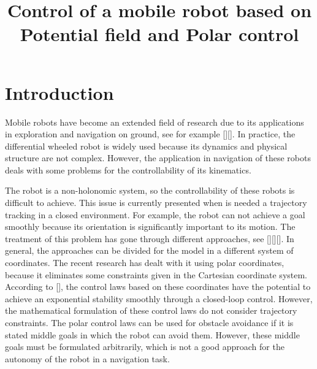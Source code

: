 \documentclass[conference]{IEEEtran}
\begin{document}
\title{Control of a mobile robot based on Potential field and Polar control}
\author{
}
\maketitle
\begin{abstract}

\end{abstract}
\IEEEpeerreviewmaketitle

\section{Introduction}

Mobile robots have become an extended field of research due to its applications in exploration and navigation on ground, see for example [][]. In practice, the differential wheeled robot is widely used because its dynamics and physical structure are not complex. However, the application in navigation of these robots deals with some problems for the controllability of its kinematics.

The robot is a non-holonomic system, so the controllability of these robots is difficult to achieve. This issue is currently presented when is needed a trajectory tracking in a closed environment. For example, the robot can not achieve a goal smoothly because its orientation is significantly important to its motion. The treatment of this problem has gone through different approaches, see [][][]. In general, the approaches can be divided for the model in a different system of coordinates. The recent research has dealt with it using polar coordinates, because it eliminates some constraints given in the Cartesian coordinate system. According to [], the control laws based on these coordinates have the potential to achieve an exponential stability smoothly through a closed-loop control. However, the mathematical formulation of these control laws do not consider trajectory constraints. The polar control laws can be used for obstacle avoidance if it is stated middle goals in which the robot can avoid them. However, these middle goals must be formulated arbitrarily, which is not a good approach for the autonomy of the robot in a navigation task.
\end{document}
